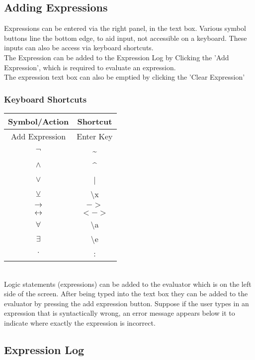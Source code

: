 \documentclass{article}
\begin{document}
	\subsection{Adding Expressions}
	
	Expressions can be entered via the right panel, in the text box. Various symbol buttons line the bottom edge, to aid input, not accessible on a keyboard. These inputs can also be access via keyboard shortcuts.\\
	The Expression can be added to the Expression Log by Clicking the 'Add Expression', which is required to evaluate an expression.\\
	The expression text box can also be emptied by clicking the 'Clear Expression'
	
	\subsubsection{Keyboard Shortcuts}
	
	\begin{tabular}{|c|c|}
		\hline
		\textbf{Symbol/Action} & \textbf{Shortcut}\\
		
		\hline
		Add Expression & Enter Key\\
		\hline
		$\lnot$ & \textasciitilde\\
		\hline
		$\land$ & \textasciicircum\\
		\hline
		$\lor$ & |\\
		\hline
		$\veebar$ & \textbackslash x\\
		\hline 
		$\rightarrow$ & $->$\\
		\hline
		$\leftrightarrow$ & $<->$\\
		\hline
		$\forall$ & \textbackslash a\\
		\hline
		$\exists$ & \textbackslash e\\
		\hline
		$\cdot$ & :\\
		\hline		
	\end{tabular}
	\\Logic statements (expressions) can be added to the evaluator which is on the left side of the screen. After being typed into the text box they can be added to the evaluator by pressing the add expression button. Suppose if the user types in an expression that is syntactically wrong, an error message appears below it to indicate where exactly the expression is incorrect.
	
	\subsection{Expression Log}
	
\end{document}
